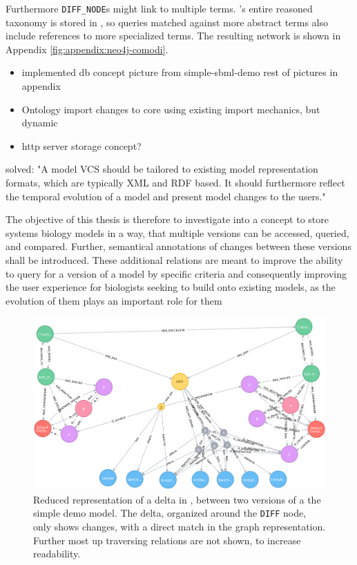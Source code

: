 Furthermore \texttt{DIFF\_NODE}s might link to multiple \comodi terms. \comodi's entire reasoned taxonomy is stored in \masymos, so queries matched against more abstract terms also include references to more specialized terms. The resulting network is shown in Appendix \ref{fig:appendix:neo4j-comodi}.


\begin{itemize}
	\item implemented db concept
		\subitem picture from simple-sbml-demo
		\subitem rest of pictures in appendix
	\item Ontology import
		\subitem changes to \masymos core
		\subitem using existing import mechanics, but dynamic
	\item http server storage concept?
\end{itemize}



solved:
"A model VCS should be tailored to existing model representation formats, which are typically XML and RDF based. It should furthermore reflect the temporal evolution of a model and present model changes to the users." \citep{Waltemath2013}

The objective of this thesis is therefore to investigate into a concept to store systems biology models in a way, that multiple versions can be accessed, queried, and compared. Further, semantical annotations of changes between these versions shall be introduced. These additional relations are meant to improve the ability to query for a version of a model by specific criteria and consequently improving the user experience for biologists seeking to build onto existing models, as the evolution of them plays an important role for them \citep{Scharm2015}

\begin{figure}
	\centering
	\includegraphics[width=\textwidth]{resources/neo4j-renders/demo-sbml-simple-diff.pdf}
	\caption[Reduced representation of a delta in \masymos, between two versions of a the simple \sbml demo model]{Reduced representation of a delta in \masymos, between two versions of a the simple \sbml demo model. The delta, organized around the \texttt{DIFF} node, only shows changes, with a direct match in the graph representation. Further most up traversing relations are not shown, to increase readability.}
	\label{fig:results:simple-diff}
	
\end{figure}